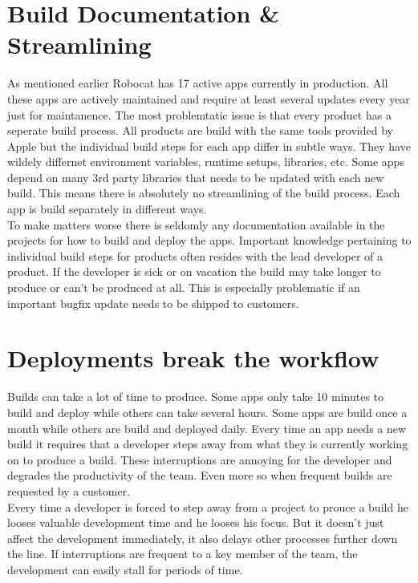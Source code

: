 \documentclass{ituthesis}
\begin{document}
\section{Build Documentation \& Streamlining}

As mentioned earlier Robocat has 17 active apps currently in production. All these apps are actively maintained and require at least several updates every year just for maintanence. The most problemtatic issue is that every product has a seperate build process. All products are build with the same tools provided by Apple but the individual build steps for each app differ in subtle ways. They have wildely differnet environment variables, runtime setups, libraries, etc. Some apps depend on many 3rd party libraries that needs to be updated with each new build. This means there is absolutely no streamlining of the build process. Each app is build separately in different ways. \\

To make matters worse there is seldomly any documentation available in the projects for how to build and deploy the apps. Important knowledge pertaining to individual build steps for products often resides with the lead developer of a product. If the developer is sick or on vacation the build may take longer to produce or can't be produced at all. This is especially problematic if an important bugfix update needs to be shipped to customers.  

\section{Deployments break the workflow}

Builds can take a lot of time to produce. Some apps only take 10 minutes to build and deploy while others can take several hours. Some apps are build once a month while others are build and deployed daily. Every time an app needs a new build it requires that a developer steps away from what they is currently working on to produce a build. These interruptions are annoying for the developer and degrades the productivity of the team. Even more so when frequent builds are requested by a customer.\\

Every time a developer is forced to step away from a project to prouce a build he looses valuable development time and he looses his focus. But it doesn't just affect the development immediately, it also delays other processes further down the line. If interruptions are frequent to a key member of the team, the development can easily stall for periods of time.
\end{document}
